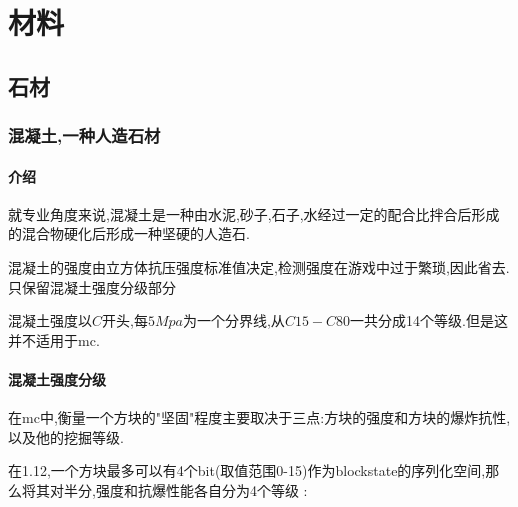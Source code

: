 \section{材料}{

  \subsection{石材}{

      \subsubsection{混凝土,一种人造石材}{
          \paragraph{介绍}{
              就专业角度来说,混凝土是一种由水泥,砂子,石子,水经过一定的配合比拌合后形成的混合物硬化后形成一种坚硬的人造石.

              混凝土的强度由立方体抗压强度标准值决定,检测强度在游戏中过于繁琐,因此省去.只保留混凝土强度分级部分

              混凝土强度以$C$开头,每$5Mpa$为一个分界线,从$C15-C80$一共分成14个等级.但是这并不适用于mc.
          }

          \paragraph{混凝土强度分级}{
              在mc中,衡量一个方块的"坚固"程度主要取决于三点:方块的强度和方块的爆炸抗性,以及他的挖掘等级.

              在1.12,一个方块最多可以有4个bit(取值范围0-15)作为blockstate的序列化空间,那么将其对半分,强度和抗爆性能各自分为4个等级 :

}}}}
